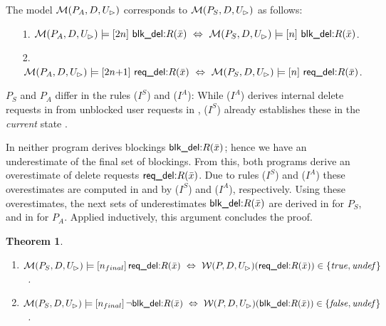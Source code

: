 \documentclass[twoside,11pt]{article}
\newtheorem{Theorem}{Theorem}
\theoremstyle{plain}
\def\rdel{\itorsf{req\_del:}}
\def\bdel{\itorsf{blk\_del:}}
\begin{document}
\begin{Lemma}\label{Lem:AFPStatelog}
The model $\mathcal M(P_A,D,U_\rhd)$ corresponds to $\mathcal M(P_S,D,U_\rhd)$
as follows:
\begin{itemize}
\item [1.]
  $\pl M(P_A,D,U_\rhd) \models \sterm{2n}\ \bdel R(\bar x) \Iff 
     \pl M(P_S,D,U_\rhd) \models \sterm{n}\ \bdel R(\bar x)$.
\item[2.]
  $\pl M(P_A,D,U_\rhd) \models \sterm{2n{+}1}\ \rdel R(\bar x) \Iff
     \pl M(P_S,D,U_\rhd) \models \sterm{n}\ \rdel R(\bar x)$.
\end{itemize}
\end{Lemma}
\begin{Proof} 
  $P_S$ and $P_A$ differ in the rules ($I^S$) and ($I^A$): While
  ($I^A$) derives internal delete requests in  from
  unblocked user requests in , ($I^S$) already establishes
  these in the \emph{current} state .

  In  neither program derives blockings $\bdel R(\bar x)$;
  hence we have an underestimate of the final set of blockings.  From
  this, both programs derive an overestimate of delete requests $\rdel
  R(\bar x)$. Due to rules ($I^S$) and ($I^A$) these overestimates are
  computed in  and  by ($I^S$) and ($I^A$),
  respectively.  Using these overestimates, the next sets of
  underestimates $\bdel R(\bar x)$ are derived in  for $P_S$,
  and in  for $P_A$.  Applied inductively, this argument
  concludes the proof.
\end{Proof}

\begin{Theorem}\label{gaga}
  \begin{enumerate}
  \item $\pl M(P_S,D,U_\rhd) \models \sterm{n_{final}}\, \rdel R(\bar x)  \ 
    \Leftrightarrow\ \pl W(P,D,U_\rhd)(\rdel R(\bar x)) \in
    \{\true,\undef\}$ ~.
  \item $\pl M(P_S,D,U_\rhd) \models \sterm{n_{final}}\, \neg \bdel
    R(\bar x) \ \Leftrightarrow\ \pl W(P,D,U_\rhd)(\bdel R(\bar x))
    \in \{\false,\undef\}$~.
  \end{enumerate}
\end{Theorem}
\end{document}
